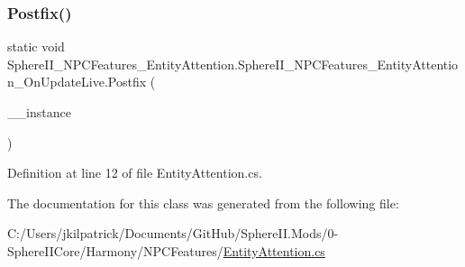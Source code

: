 \subsubsection{\texorpdfstring{Postfix()}{Postfix()}}
{\footnotesize\ttfamily static void Sphere\+I\+I\+\_\+\+N\+P\+C\+Features\+\_\+\+Entity\+Attention.\+Sphere\+I\+I\+\_\+\+N\+P\+C\+Features\+\_\+\+Entity\+Attention\+\_\+\+On\+Update\+Live.\+Postfix (\begin{DoxyParamCaption}\item[{Entity\+Alive}]{\+\_\+\+\_\+instance }\end{DoxyParamCaption})\hspace{0.3cm}{\ttfamily [static]}}



Definition at line 12 of file Entity\+Attention.\+cs.



The documentation for this class was generated from the following file\+:\begin{DoxyCompactItemize}
\item 
C\+:/\+Users/jkilpatrick/\+Documents/\+Git\+Hub/\+Sphere\+I\+I.\+Mods/0-\/\+Sphere\+I\+I\+Core/\+Harmony/\+N\+P\+C\+Features/\mbox{\hyperlink{_entity_attention_8cs}{Entity\+Attention.\+cs}}\end{DoxyCompactItemize}
